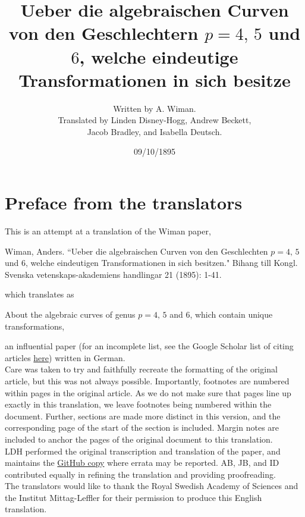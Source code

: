 \documentclass[leqno]{article}
\title{Ueber die algebraischen Curven von den Geschlechtern $p = 4, \, 5$ und $6$, welche eindeutige Transformationen in sich besitze }
\author{Written by A. Wiman. \\
Translated by Linden Disney-Hogg, Andrew Beckett, \\
Jacob Bradley, and Isabella Deutsch.}
\date{09/10/1895}
\begin{document}
\maketitle

\section*{Preface from the translators}
This is an attempt at a translation of the Wiman paper,
\begin{center}
	Wiman, Anders. ``Ueber die algebraischen Curven von den Geschlechten $p= 4, \, 5$ und $6$, welche eindeutigen Transformationen in sich besitzen."  Bihang till Kongl. Svenska vetenskaps-akademiens handlingar 21 (1895): 1-41.
\end{center}
which translates as 
\begin{center}
	About the algebraic curves of genus $p=4, \, 5$ and $6$, which contain unique transformations, 
\end{center}
 an influential paper (for an incomplete list, see the Google Scholar list of citing articles \href{https://scholar.google.com/scholar?start=0&hl=en&as_sdt=2005&sciodt=0,5&cites=15232192074326267713&scipsc=}{here}) written in German. \\
Care was taken to try and faithfully recreate the formatting of the original article, but this was not always possible. Importantly, footnotes are numbered within pages in the original article. As we do not make sure that pages line up exactly in this translation, we leave footnotes being numbered within the document. Further, sections are made more distinct in this version, and the corresponding page of the start of the section is included. Margin notes are included to anchor the pages of the original document to this translation. \\
LDH performed the original transcription and translation of the paper, and maintains the \href{https://github.com/DisneyHogg/Wiman-Translation}{GitHub copy} where errata may be reported. AB, JB, and ID contributed equally in refining the translation and providing proofreading. \\
The translators would like to thank the Royal Swedish Academy of Sciences and the Institut Mittag-Leffler for their permission to produce this English translation. 
\end{document}

